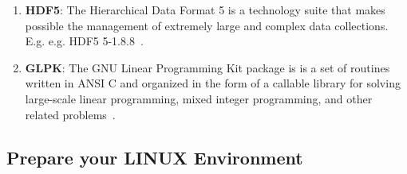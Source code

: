 \begin{enumerate}%
\item \textbf{HDF5}: The Hierarchical Data Format 5 is a technology suite that makes possible the management of extremely large and complex data collections. E.g. e.g. HDF5  5-1.8.8~\cite{HDF5}.

\item \textbf{GLPK}: The GNU Linear Programming Kit package is is a set of routines written in ANSI C and organized in the form of a callable library for solving large-scale linear programming, mixed integer programming, and other related problems~\cite{GLPK}. 
% 
% 
\end{enumerate}%

             




\subsection{Prepare your LINUX Environment}\label{sec:prepare}

